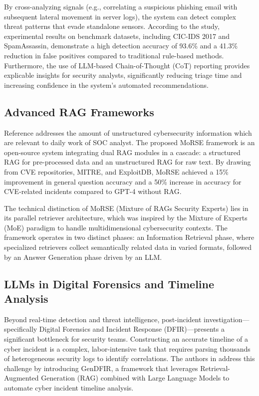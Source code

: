 \documentclass[conference]{IEEEtran}
\begin{document}
By cross-analyzing signals (e.g., correlating a suspicious phishing email with subsequent lateral movement in server logs), 
the system can detect complex threat patterns that evade standalone sensors. 
According to the study, experimental results on benchmark datasets, including CIC-IDS 2017 and SpamAssassin, 
demonstrate a high detection accuracy of 93.6\% and a 41.3\% reduction in false positives compared to traditional rule-based methods. 
Furthermore, the use of LLM-based Chain-of-Thought (CoT) reporting provides explicable insights for security analysts, significantly reducing triage time and increasing confidence in the system's automated recommendations.

\subsection{Advanced RAG Frameworks}\label{sec:rag}
Reference \cite{b4} addresses the amount of unstructured cybersecurity information which are relevant to daily work of SOC analyst. 
The proposed MoRSE framework is an open-source system integrating dual RAG modules in a cascade: a structured RAG for pre-processed data 
and an unstructured RAG for raw text. By drawing from CVE repositories, MITRE, and ExploitDB, MoRSE achieved 
a 15\% improvement in general question accuracy and a 50\% increase in accuracy for CVE-related incidents compared to GPT-4 without RAG.

The technical distinction of MoRSE (Mixture of RAGs Security Experts) lies in its parallel retriever architecture, which was inspired by the Mixture of Experts (MoE) paradigm to handle multidimensional cybersecurity contexts. 
The framework operates in two distinct phases: an Information Retrieval phase, where specialized retrievers collect semantically related data in varied formats,
followed by an Answer Generation phase driven by an LLM. 

\subsection{LLMs in Digital Forensics and Timeline Analysis}\label{sec:forensics}
Beyond real-time detection and threat intelligence, post-incident investigation—specifically Digital Forensics and Incident Response (DFIR)—presents a significant bottleneck for security teams. 
Constructing an accurate timeline of a cyber incident is a complex, labor-intensive task that requires parsing thousands of heterogeneous security logs to identify correlations. 
The authors in \cite{b7} address this challenge by introducing GenDFIR, a framework that leverages Retrieval-Augmented Generation (RAG) combined with Large Language Models to automate cyber incident timeline analysis.
\end{document}
